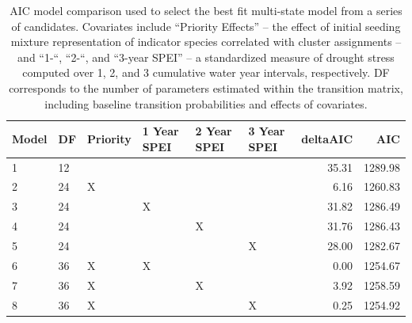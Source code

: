 \documentclass[twoside,12pt,final]{ucthesis-CA2012}
\begin{document}
\begin{ucmainmatter}
\pagebreak
\begin{table}[ht]
\centering
{}
\caption{Contingency table of observed transitions between state assignments between 2008-2018. For each plot observation of a state assignment in year t (rows), data shows the frequency of state assignments (columns) of the same plot in a subsequent year (t + 1). Diagonal values represent the frequency of a given state retaining its assignment (persistence), while off-diagonal values represent transitions in state assignment. Changes in assignment frequency were highly non-random (<U+03C7>2 = 392.017, df = 9, P < 0.001).} 
\end{table}
\begin{table}[ht]
\centering
\begin{tabular}{llllllrr}
  \hline
Model & DF & Priority & 1 Year SPEI & 2 Year SPEI & 3 Year SPEI & deltaAIC & AIC \\ 
  \hline
1 & 12 &  &  &  &  & 35.31 & 1289.98 \\ 
  2 & 24 & X &  &  &  & 6.16 & 1260.83 \\ 
  3 & 24 &  & X &  &  & 31.82 & 1286.49 \\ 
  4 & 24 &  &  & X &  & 31.76 & 1286.43 \\ 
  5 & 24 &  &  &  & X & 28.00 & 1282.67 \\ 
  6 & 36 & X & X &  &  & 0.00 & 1254.67 \\ 
  7 & 36 & X &  & X &  & 3.92 & 1258.59 \\ 
  8 & 36 & X &  &  & X & 0.25 & 1254.92 \\ 
   \hline
\end{tabular}
\caption{AIC model comparison used to select the best fit multi-state model from a series of candidates. Covariates include “Priority Effects” – the effect of initial seeding mixture representation of indicator species correlated with cluster assignments – and “1-“, “2-“, and “3-year SPEI” – a standardized measure of drought stress computed over 1, 2, and 3 cumulative water year intervals, respectively. DF corresponds to the number of parameters estimated within the transition matrix, including baseline transition probabilities and effects of covariates.} 

\end{table}
\end{ucmainmatter}
\end{document}
